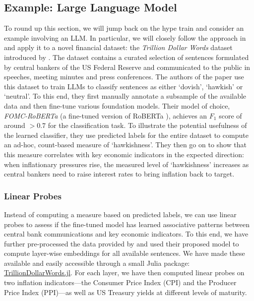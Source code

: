 \documentclass{article}
\theoremstyle{plain}
\theoremstyle{definition}
\theoremstyle{remark}
\begin{document}


\subsection{Example: Large Language Model}\label{ex-llm}

To round up this section, we will jump back on the hype train and
consider an example involving an LLM. In particular, we will closely
follow the approach in \cite{gurnee2023language} and apply it to a novel
financial dataset: the \emph{Trillion Dollar Words} dataset introduced
by \cite{shah2023trillion}. The dataset contains a curated
selection of sentences formulated by central bankers of the US Federal
Reserve and communicated to the public in speeches, meeting minutes and
press conferences. The authors of the paper use this dataset to train
LLMs to classify sentences as either `dovish', `hawkish' or `neutral'.
To this end, they first manually annotate a subsample of the available
data and then fine-tune various foundation models. Their model of
choice, \emph{FOMC-RoBERTa} (a fine-tuned version of RoBERTa \cite{liu2019roberta}), achieves an \(F_1\) score of around \(>0.7\) for the
classification task. To illustrate the potential usefulness of the
learned classifier, they use predicted labels for the entire dataset to
compute an ad-hoc, count-based measure of `hawkishness'. They then go on
to show that this measure correlates with key economic indicators in the
expected direction: when inflationary pressures rise, the measured level
of `hawkishness' increases as central bankers need to raise interest
rates to bring inflation back to target.

\subsubsection{Linear Probes}\label{linear-probes}

Instead of computing a measure based on predicted labels, we can use linear probes to assess if the fine-tuned model has learned associative patterns between central bank communications and key economic indicators. To this end, we have further pre-processed the data provided by \cite{shah2023trillion} and used their proposed model to compute layer-wise embeddings for all available sentences. We have made these available and easily accessible through a small Julia package: \href{https://anonymous.4open.science/r/TrillionDollarWords/README.md}{TrillionDollarWords.jl}. For each layer, we have then computed linear probes on two inflation indicators---the Consumer Price Index (CPI) and the Producer Price Index (PPI)---as well as US Treasury yields at different levels of maturity. 
\end{document}
